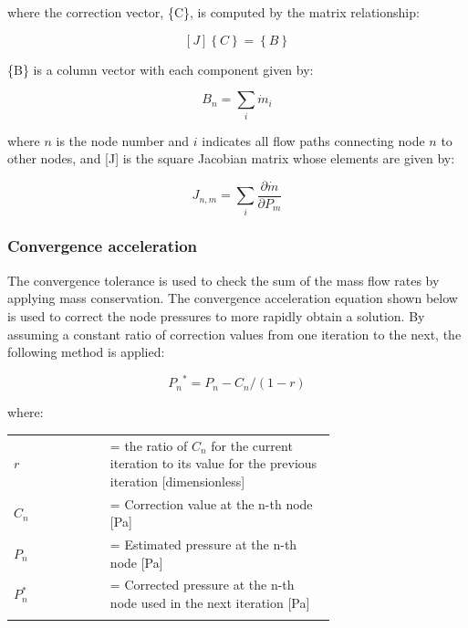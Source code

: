 where the correction vector, \{C\}, is computed by the matrix relationship:

\begin{equation}
\left[ J \right]\left\{ C \right\} = \left\{ B \right\}
\end{equation}

\{B\} is a column vector with each component given by:

\begin{equation}
B_n = \sum_{i} \dot{m}_i
\end{equation}

where $n$ is the node number and $i$ indicates all flow paths connecting node $n$ to other nodes, and [J] is the square Jacobian matrix whose elements are given by:

\begin{equation}
J_{n,m} = \sum_{i} \frac{\partial \dot{m}}{\partial P_m}
\end{equation}

\subsubsection{Convergence acceleration}\label{convergence-acceleration}

The convergence tolerance is used to check the sum of the mass flow rates by applying mass conservation. The convergence acceleration equation shown below is used to correct the node pressures to more rapidly obtain a solution. By assuming a constant ratio of correction values from one iteration to the next, the following method is applied:

\begin{equation}
{P_n}^* = P_n - C_n/(1 - r)
\end{equation}

where:

\begin{tabular}{lp{0.7\linewidth}}
\\
$r$ &= the ratio of $C_n$ for the current iteration to its value for the previous iteration [dimensionless]\\
$C_n$ &= Correction value at the n-th node [Pa]\\
$P_n$ &= Estimated pressure at the n-th node [Pa]\\
$P_n^*$ &= Corrected pressure at the n-th node used in the next iteration [Pa]\\
\\
\end{tabular}

